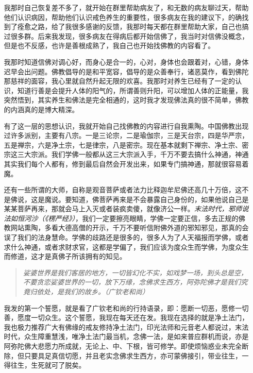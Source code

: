 我那时自己恢复差不多了，就开始在群里帮助病友了，和无数的病友聊过天，帮助他们认识病因，帮助他们认识戒色养生的重要性，很多病友在我的建议下，的确找到了痊愈之路，给了我很多感谢的反馈，我那时每天都在群里帮助大家，自己也搞过很多群。后来我发现，很多病友在得病后都开始信佛了，我当时对信佛没概念，但是也不反感，也许是善根成熟了，我自己也开始找佛教的内容看了。

我那时知道信佛对调心好，而身心是合一的，心对，身体也会跟着对，心错，身体迟早会出问题。佛教倡导的是和平宽容，倡导的是众善奉行，诸恶莫作，看到佛陀那慈祥的面容，我心里就自然升起无限的欢喜。我那时对养生已经有了一定的认识，知道行善是会提升人体的阳气的，所谓善则升阳，可以增加人体的正能量，我突然悟到，其实养生和佛法是完全相通的，这时我才发现佛法真的很不简单，佛教的内涵真的是博大精深。

有了这一层的思想认识，我就开始自己找佛教的内容进行自我熏陶。中国佛教出现过许多派别，主要有八宗。一是三论宗，二是瑜伽宗，三是天台宗，四是华严宗，五是禅宗，六是净土宗，七是律宗，八是密宗。现在基本就剩下禅宗、净土宗、密宗这三大宗派。我们学佛一般都从这三大宗派入手，千万不要去搞什么神通，神通其实我们每个人都有，修到最后自然会开发出来，如果专门搞神通，那就很容易着魔。

还有一些所谓的大师，自称是观音菩萨或者法力比释迦牟尼佛还高几十万倍，这不是佛说，这是魔说。要知道，佛菩萨再来是不会暴露自己身份的，如果他说自己是某某菩萨再来，那就会马上入灭或者装疯卖傻，就像济公一样。\textit{末法时代，邪师说法如恒河沙（《楞严经》）}，我们一定要擦亮眼睛，学佛一定要正信，多去正规的佛教网站熏陶，多看大德高僧的开示，千万不要听信附佛外道的邪知邪见，那真的会误了我们的法身慧命。学佛的歧路还是很多的，很多人为了人天福报而学佛，或者求什么神通，或者求财求官，这都是学偏了，我们应该为度众生而学佛，为度众生而修道，这才是真佛子所该拥有的知见。

\begin{quote}\it
    娑婆世界是我们客居的地方，一切皆幻化不实，如戏梦一场，到头总是空，不要贪恋娑婆世界的一切，放下万缘，念佛求生西方，阿弥陀佛才是我们究竟归依处，是我们的故乡。（广钦老和尚）
\end{quote}

我发的第一个誓愿，就是看了广钦老和尚的行持语录，即：愿断一切恶，愿修一切善，愿度一切众生。这个誓愿，我现在每天还在发。我现在选择的就是净土法门，我也极力推荐广大有佛缘的戒友修持净土法门，印光法师和元音老人都说过，末法时代，众生障重慧浅，唯净土法门最当机，念佛一法，是如来普应群机而说，亦是阿弥陀佛大悲愿力所成就，无论上、中、下根，皆可修学。即使烦恼惑业未完全断除，但只要具足真信切愿，并且老实念佛求生西方，亦可蒙佛接引，带业往生，一得往生，生死就可了脱矣。

